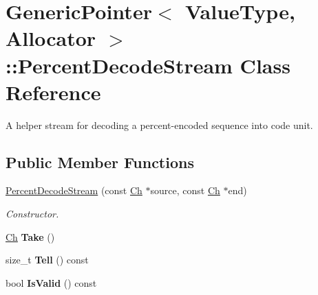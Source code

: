 \hypertarget{class_generic_pointer_1_1_percent_decode_stream}{}\section{Generic\+Pointer$<$ Value\+Type, Allocator $>$\+:\+:Percent\+Decode\+Stream Class Reference}
\label{class_generic_pointer_1_1_percent_decode_stream}


A helper stream for decoding a percent-\/encoded sequence into code unit.  


\subsection*{Public Member Functions}
\begin{DoxyCompactItemize}
\item 
\hyperlink{class_generic_pointer_1_1_percent_decode_stream_a1cece709ab2089cc6a8f60cf5df52802}{Percent\+Decode\+Stream} (const \hyperlink{class_generic_pointer_a38b73c84d37428340066d907f9d4f37f}{Ch} $\ast$source, const \hyperlink{class_generic_pointer_a38b73c84d37428340066d907f9d4f37f}{Ch} $\ast$end)
\begin{DoxyCompactList}\small\item\em Constructor. \end{DoxyCompactList}\item 
\hyperlink{class_generic_pointer_a38b73c84d37428340066d907f9d4f37f}{Ch} {\bfseries Take} ()\hypertarget{class_generic_pointer_1_1_percent_decode_stream_a02da9a260a75c767b7ae6bffd37b255d}{}\label{class_generic_pointer_1_1_percent_decode_stream_a02da9a260a75c767b7ae6bffd37b255d}

\item 
size\+\_\+t {\bfseries Tell} () const \hypertarget{class_generic_pointer_1_1_percent_decode_stream_af9ed027feb3fa8d62364f75ff9931c1a}{}\label{class_generic_pointer_1_1_percent_decode_stream_af9ed027feb3fa8d62364f75ff9931c1a}

\item 
bool {\bfseries Is\+Valid} () const \hypertarget{class_generic_pointer_1_1_percent_decode_stream_a0deba6d1e988138c1431028b7fdfde3d}{}\label{class_generic_pointer_1_1_percent_decode_stream_a0deba6d1e988138c1431028b7fdfde3d}

\end{DoxyCompactItemize}
